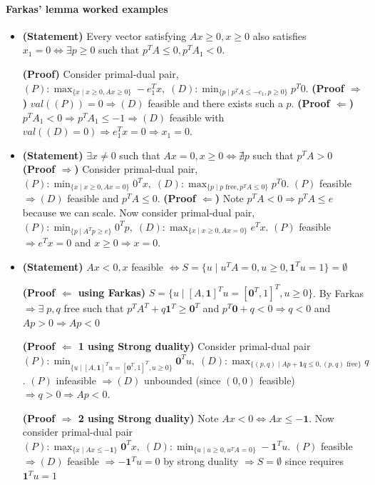 \documentclass{article}
\begin{document}
\paragraph{Farkas' lemma worked examples}
\begin{itemize}
    \item \textbf{(Statement)} Every vector satisfying $Ax \geq 0, x\geq 0$ also satisfies $x_1 = 0 \iff \exists p\geq 0$ such that $p^TA \leq 0, p^TA_1 < 0$. 
    
    \textbf{(Proof)} Consider primal-dual pair, $(P):\max_{\{x\mid x\geq 0, Ax\geq 0\}}-e_1^Tx,\; (D): \min_{\{p\mid p^TA\leq -e_1, p\geq 0\}}p^T0$. \textbf{(Proof $\Rightarrow$)} $val((P)) = 0 \Longrightarrow (D)$ feasible and there exists such a $p$. \textbf{(Proof $\Leftarrow$)} $p^TA_1 < 0 \Rightarrow p^TA_1 \leq -1 \Rightarrow (D)$ feasible with $val((D) = 0) \Longrightarrow e_1^Tx = 0 \Longrightarrow x_1 = 0$.

    \item \textbf{(Statement)} $\exists x \neq 0$ such that $Ax=0, x\geq 0 \iff \nexists p$ such that $p^TA > 0$
    \newline\textbf{(Proof $\Rightarrow$)} Consider primal-dual pair, $(P):\min_{\{x\mid x\geq 0, Ax= 0\}}0^Tx,\; (D): \max_{\{p\mid p \text{ free}, p^TA\leq 0\}}p^T0$. $(P)$ feasible $\Rightarrow (D)$ feasible and $p^TA \leq 0$. \textbf{(Proof $\Leftarrow$)} Note $p^TA < 0 \Rightarrow p^TA \leq e$ because we can scale. Now consider primal-dual pair, $(P):\min_{\{p\mid A^Tp \geq e\}}0^Tp,\; (D): \max_{\{x \mid x\geq 0, Ax = 0\}}e^Tx$. $(P)$ feasible $\Rightarrow e^Tx = 0$ and $x\geq 0 \Rightarrow x = 0$. 

    \item \textbf{(Statement)} $Ax < 0, x$ feasible $\iff S = \{u \mid u^TA = 0, u \geq 0, \mathbf{1}^Tu = 1\} = \emptyset$
    
    \textbf{(Proof $\Leftarrow$ using Farkas)} $S = \{u \mid [A, \mathbf{1}]^Tu = [\mathbf{0}^T, 1]^T, u \geq 0\}$. By Farkas $\Longrightarrow \exists\;p, q$ free such that $p^TA^T + q\mathbf{1}^T \geq \mathbf{0}^T$ and $p^T\mathbf{0} + q < 0 \Longrightarrow q < 0$ and $Ap > 0 \Longrightarrow Ap < 0$

    \textbf{(Proof $\Leftarrow$ 1 using Strong duality)} Consider primal-dual pair $(P): \min_{\{u\mid  [A, \mathbf{1}]^Tu = [\mathbf{0}^T, 1]^T, u \geq 0\}}\mathbf{0}^Tu,\; (D): \max_{\{(p,q)\mid Ap + \mathbf{1}q \leq 0, (p,q) \text{ free}\}} q$. $(P)$ infeasible $\Longrightarrow (D)$ unbounded (since $(0,0)$ feasible) $\Longrightarrow q > 0 \Longrightarrow Ap < 0$.

    \textbf{(Proof $\Rightarrow$ 2 using Strong duality)} Note $Ax < 0 \iff Ax \leq -\mathbf{1}$. Now consider primal-dual pair $(P): \max_{\{x\mid Ax \leq -\mathbf{1}\}}\mathbf{0}^Tx,\; (D): \min_{\{u\mid u\geq 0, u^TA = 0\}} -\mathbf{1}^Tu$. $(P)$ feasible $\Longrightarrow (D)$ feasible $\Longrightarrow  -\mathbf{1}^Tu=0$ by strong duality $\Longrightarrow S = \emptyset$ since requires $\mathbf{1}^Tu = 1$
\end{itemize} 
\end{document}

